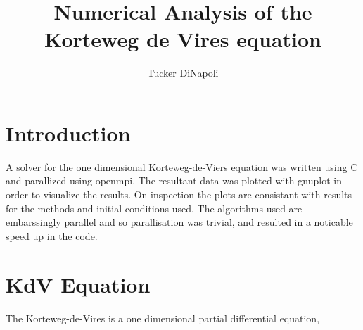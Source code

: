 \documentclass[twoculumn]{article}
\author{Tucker DiNapoli}
\title{Numerical Analysis of the Korteweg de Vires equation}
\begin{document}
\maketitle
\section{Introduction}
A solver for the one dimensional Korteweg-de-Viers equation was written using C
and parallized using openmpi. The resultant data was plotted with gnuplot in
order to visualize the results. On inspection the plots are consistant with
results for the methods and initial conditions used. The algorithms used are
embarssingly parallel and so parallisation was trivial, and resulted in a
noticable speed up in the code.
\section{KdV Equation}
The Korteweg-de-Vires is a one dimensional partial differential equation, 
\end{document}
